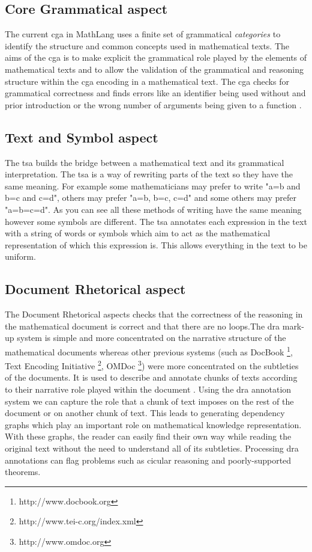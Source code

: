 \subsection{Core Grammatical aspect \label{subsec:cga}}
The current \gls{cga} in MathLang uses a finite set of grammatical \textit{categories} to identify the structure and common concepts used in mathematical texts. The aims of the \gls{cga} is to make explicit the grammatical role played by the elements of mathematical texts and to allow the validation of the grammatical and reasoning structure within the \gls{cga} encoding in a mathematical text. The \gls{cga} checks for grammatical correctness and finds errors like an identifier being used without and prior introduction or the wrong number of arguments being given to a function \cite{krzysztofphd}.

\subsection{Text and Symbol aspect \label{subsec:tsa}}
The \gls{tsa} builds the bridge between a mathematical text and its grammatical interpretation. The \gls{tsa} is a way of rewriting parts of the text so they have the same meaning. For example some mathematicians may prefer to write "a=b and b=c and c=d", others may prefer "a=b, b=c, c=d" and some others may prefer "a=b=c=d". As you can see all these methods of writing have the same meaning however some symbols are different. The \gls{tsa} annotates each expression in the text with a string of words or symbols which aim to act as the mathematical representation of which this expression is. This allows everything in the text to be uniform.

\subsection{Document Rhetorical aspect \label{subsec:dra}}

The Document Rhetorical aspects checks that the correctness of the reasoning in the mathematical document is correct and that there are no loops.The \gls{dra} mark-up system is simple and more concentrated on the narrative structure of the mathematical documents whereas other previous systems (such as DocBook \footnote{http://www.docbook.org}, Text Encoding Initiative \footnote{http://www.tei-c.org/index.xml}, OMDoc \footnote{http://www.omdoc.org}) were more concentrated on  the subtleties of the documents. It is used to describe and annotate chunks of texts according to their narrative role played within the document \cite{krzysztofphd}. Using the \gls{dra} annotation system we can capture the role that a chunk of text imposes on the rest of the document or on another chunk of text. This leads to generating dependency graphs which play an important role on mathematical knowledge representation. With these graphs, the reader can easily find their own way while reading the original text without the need to understand all of its subtleties. Processing \gls{dra} annotations can flag problems such as cicular reasoning and poorly-supported theorems.

